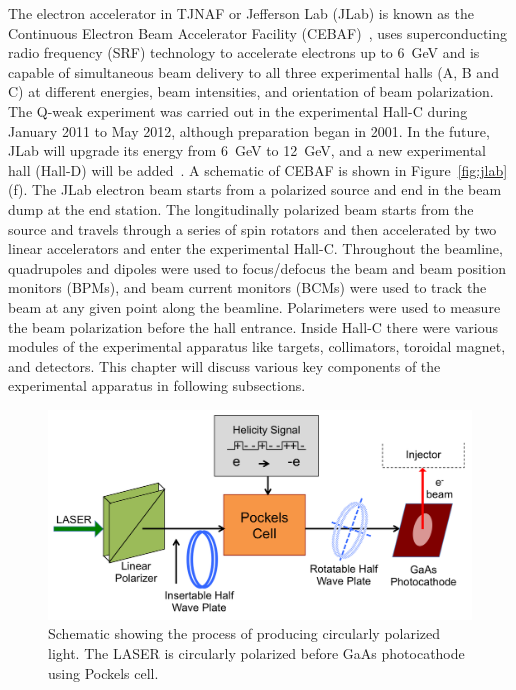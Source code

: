 The electron accelerator in TJNAF or Jefferson Lab (JLab) is known as the Continuous Electron Beam Accelerator Facility 
(CEBAF)~\cite{Leemann_CEBAF}, uses superconducting radio frequency (SRF) technology to accelerate electrons up to 6~GeV and is capable of simultaneous beam delivery to all three experimental halls (A, B and C) at different energies, beam intensities, and orientation of beam polarization. The Q-weak experiment was carried out in the experimental Hall-C during January 2011 to May 2012, although preparation began in 2001. In the future, JLab will upgrade its energy from 6~GeV to 12~GeV, and a new experimental hall (Hall-D) will be added~\cite{website:jlab_12GeV}. A schematic of CEBAF is shown in Figure~\ref{fig:jlab} (f). The JLab electron beam starts from a polarized source and end in the beam dump at the end station. The longitudinally polarized beam starts from the source and travels through a series of spin rotators and then accelerated by two linear accelerators and enter the experimental Hall-C. Throughout the beamline, quadrupoles and dipoles were used to focus/defocus the beam and beam position monitors (BPMs), and beam current monitors (BCMs) were used to track the beam at any given point along the beamline. 
Polarimeters were used to measure the beam polarization before the hall entrance. 
Inside Hall-C there were various modules of the experimental apparatus like targets, collimators, toroidal magnet, and detectors.
This chapter will discuss various key components of the experimental apparatus in following subsections.

\begin{singlespace}
\begin{figure}[!h]
	\begin{center}
	\includegraphics[width=15.0cm]{figures/source}
	\end{center}
	\caption
	{Schematic showing the process of producing circularly polarized light. The LASER is circularly polarized before GaAs photocathode using Pockels cell.}
	\label{fig:source}
\end{figure}
\end{singlespace}


